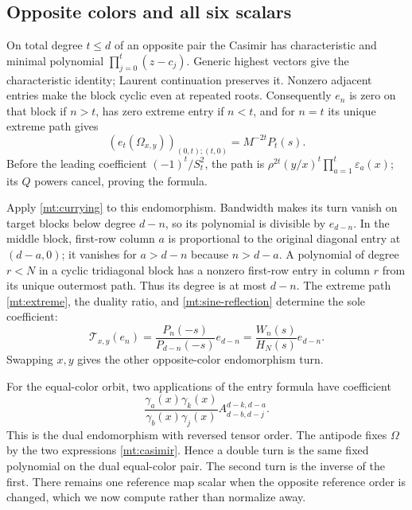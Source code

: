 \documentclass[11pt]{article}
\numberwithin{equation}{section}
\theoremstyle{definition}\newtheorem{definition}[theorem]{Definition}
\theoremstyle{remark}\newtheorem{remark}[theorem]{Remark}
\newcommand{\Turn}{\mathscr T}
\begin{document}
\subsection{Opposite colors and all six scalars}
On total degree $t\le d$ of an opposite pair the Casimir has
characteristic and minimal polynomial $\prod_{j=0}^t(z-c_j)$.
Generic highest vectors give the characteristic identity; Laurent
continuation preserves it. Nonzero adjacent entries make the block
cyclic even at repeated roots. Consequently $e_n$ is zero on that
block if $n>t$, has zero extreme entry if $n<t$, and for $n=t$
its unique extreme path gives
\begin{equation}\label{mt:extreme}
 (e_t(\Omega_{x,y}))_{(0,t);(t,0)}=M^{-2t}P_t(s).
\end{equation}
Before the leading coefficient $(-1)^t/S_t^2$, the path is
$\rho^{2t}(y/x)^t\prod_{a=1}^t\varepsilon_a(x)$; its $Q$ powers
cancel, proving the formula.

Apply \eqref{mt:currying} to this endomorphism. Bandwidth makes its
turn vanish on target blocks below degree $d-n$, so its polynomial
is divisible by $e_{d-n}$. In the middle block, first-row column $a$
is proportional to the original diagonal entry at $(d-a,0)$; it
vanishes for $a>d-n$ because $n>d-a$. A polynomial of degree $r<N$
in a cyclic tridiagonal block has a nonzero first-row entry in column
$r$ from its unique outermost path. Thus its degree is at most
$d-n$. The extreme path \eqref{mt:extreme}, the duality ratio, and
\eqref{mt:sine-reflection} determine the sole coefficient:
\begin{equation}\label{mt:mixed-turn}
 \Turn_{x,y}(e_n)=\frac{P_n(-s)}{P_{d-n}(-s)}e_{d-n}
                         =\frac{W_n(s)}{H_N(s)}e_{d-n}.
\end{equation}
Swapping $x,y$ gives the other opposite-color endomorphism turn.

For the equal-color orbit, two applications of the entry formula
have coefficient
\[
 \frac{\gamma_a(x)\gamma_k(x)}{\gamma_b(x)\gamma_j(x)}
                  A^{d-k,d-a}_{d-b,d-j}.
\]
This is the dual endomorphism with reversed tensor order.
The antipode fixes $\Omega$ by the two expressions
\eqref{mt:casimir}. Hence a double turn is the same fixed polynomial
on the dual equal-color pair. The second turn is the inverse of the
first. There remains one reference map scalar when the opposite reference
order is changed, which we now compute rather than normalize away.
\end{document}
